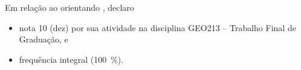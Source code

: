 %
%


Em relação ao orientando \authorname, declaro
\begin{itemize}
  \item nota 10 (dez) por sua atividade na disciplina GEO213 -- Trabalho Final de Graduação, e
  \item frequência integral (100~\%).
\end{itemize}	


\vspace{1cm}
\begin{center}
  \baselineskip=2cm
	\Orientador
\end{center}

%

